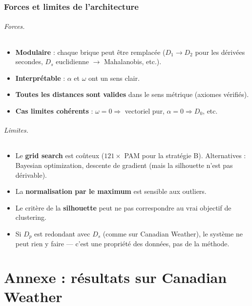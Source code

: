 \documentclass[11pt, a4paper]{article}
\newcommand{\Dp}{D_p}
\theoremstyle{definition}
\theoremstyle{remark}
\begin{document}
\section{Forces et limites de l'architecture}

\paragraph{Forces.}
\begin{itemize}[nosep]
  \item \textbf{Modulaire} : chaque brique peut être remplacée ($D_1 \to D_2$
    pour les dérivées secondes, $D_s$ euclidienne $\to$ Mahalanobis, etc.).
  \item \textbf{Interprétable} : $\alpha$ et $\omega$ ont un sens clair.
  \item \textbf{Toutes les distances sont valides} dans le sens métrique
    (axiomes vérifiés).
  \item \textbf{Cas limites cohérents} : $\omega = 0 \Rightarrow$ vectoriel
    pur, $\alpha = 0 \Rightarrow D_0$, etc.
\end{itemize}

\paragraph{Limites.}
\begin{itemize}[nosep]
  \item Le \textbf{grid search} est coûteux ($121 \times$ PAM pour la
    stratégie B). Alternatives : Bayesian optimization, descente de gradient
    (mais la silhouette n'est pas dérivable).
  \item La \textbf{normalisation par le maximum} est sensible aux outliers.
  \item Le critère de la \textbf{silhouette} peut ne pas correspondre au vrai
    objectif de clustering.
  \item Si $\Dp$ est redondant avec $D_s$ (comme sur Canadian Weather), le
    système ne peut rien y faire — c'est une propriété des données, pas de
    la méthode.
\end{itemize}

\newpage
\part{Annexe : résultats sur Canadian Weather}
\end{document}
